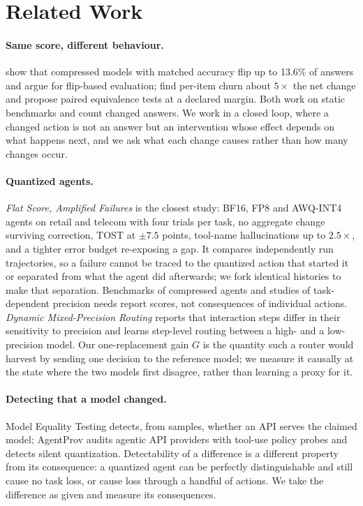\section{Related Work}
\label{sec:related}

\paragraph{Same score, different behaviour.} \citet{dutta2024accuracy} show that compressed models with matched accuracy flip up to 13.6\% of answers and argue for flip-based evaluation; \citet{singh2026certifying} find per-item churn about $5\times$ the net change and propose paired equivalence tests at a declared margin. Both work on static benchmarks and count changed answers. We work in a closed loop, where a changed action is not an answer but an intervention whose effect depends on what happens next, and we ask what each change causes rather than how many changes occur.

\paragraph{Quantized agents.} \emph{Flat Score, Amplified Failures} \citep{jang2026flat} is the closest study: BF16, FP8 and AWQ-INT4 agents on \tautwo{} retail and telecom with four trials per task, no aggregate change surviving correction, TOST at $\pm 7.5$ points, tool-name hallucinations up to $2.5\times$, and a tighter error budget re-exposing a gap. It compares independently run trajectories, so a failure cannot be traced to the quantized action that started it or separated from what the agent did afterwards; we fork identical histories to make that separation. Benchmarks of compressed agents \citep{dong2025acbench} and studies of task-dependent precision needs \citep{lu2026mixquant,zhang2026quantclaw} report scores, not consequences of individual actions. \emph{Dynamic Mixed-Precision Routing} \citep{li2026dynamicmp} reports that interaction steps differ in their sensitivity to precision and learns step-level routing between a high- and a low-precision model. Our one-replacement gain $G$ is the quantity such a router would harvest by sending one decision to the reference model; we measure it causally at the state where the two models first disagree, rather than learning a proxy for it.

\paragraph{Detecting that a model changed.} Model Equality Testing \citep{gao2025model} detects, from samples, whether an API serves the claimed model; AgentProv \citep{wang2026agentprov} audits agentic API providers with tool-use policy probes and detects silent quantization. Detectability of a difference is a different property from its consequence: a quantized agent can be perfectly distinguishable and still cause no task loss, or cause loss through a handful of actions. We take the difference as given and measure its consequences.

